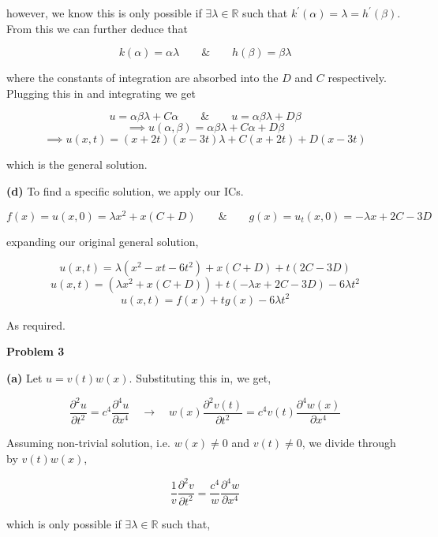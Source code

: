 \documentclass[10pt]{article}
\newcommand{\R}{\mathbb{R}}
\begin{document}
however, we know this is only possible if $\exists \lambda \in \R$ such that $ k^{\prime}(\alpha) = \lambda = h^{\prime}(\beta)$. From this we can further deduce that

$$k(\alpha) = \alpha \lambda \hspace{2em} \& \hspace{2em} h(\beta) = \beta \lambda$$

where the constants of integration are absorbed into the $D$ and $C$ respectively. Plugging this in and integrating we get

$$u = \alpha\beta\lambda + C\alpha \hspace{2em} \& \hspace{2em} u = \alpha\beta\lambda + D\beta$$
$$\implies u(\alpha,\beta) = \alpha\beta\lambda +C\alpha + D\beta$$
$$\implies u(x,t) = (x + 2t)(x - 3t)\lambda + C(x + 2t) + D(x - 3t)$$

which is the general solution.

\textbf{(d)}
To find a specific solution, we apply our ICs.

$$f(x) = u(x,0) = \lambda x^{2} + x(C + D) \hspace{2em} \& \hspace{2em} g(x) = u_{t}(x,0) = -\lambda x + 2C-3D$$

expanding our original general solution,

$$u(x,t) = \lambda(x^{2} - xt -6t^{2}) + x(C+D) + t(2C - 3D)$$
$$u(x,t) = (\lambda x^{2} + x(C+D)) + t(-\lambda x + 2C - 3D) - 6\lambda t^{2}$$
$$u(x,t) = f(x) + tg(x) - 6\lambda t^{2}$$

As required.

\newpage

\textbf{Problem 3}

\textbf{(a)}
Let $u = v(t)w(x)$. Substituting this in, we get,

$$\frac{\partial^{2}u}{\partial t^{2}} = c^{4} \frac{\partial^{4}u}{\partial x^{4}} \hspace{1em} \to \hspace{1em} w(x)\frac{\partial^{2}v(t)}{\partial t^{2}} = c^{4}v(t)\frac{\partial^{4}w(x)}{\partial x^{4}}$$

Assuming non-trivial solution, i.e. $w(x) \neq 0$ and $v(t) \neq 0$, we divide through by $v(t)w(x)$,

$$ \frac{1}{v}\frac{\partial^{2}v}{\partial t^{2}} = \frac{c^{4}}{w}\frac{\partial^{4}w}{\partial x^{4}}$$

which is only possible if $\exists \lambda \in \R$ such that,
\end{document}
